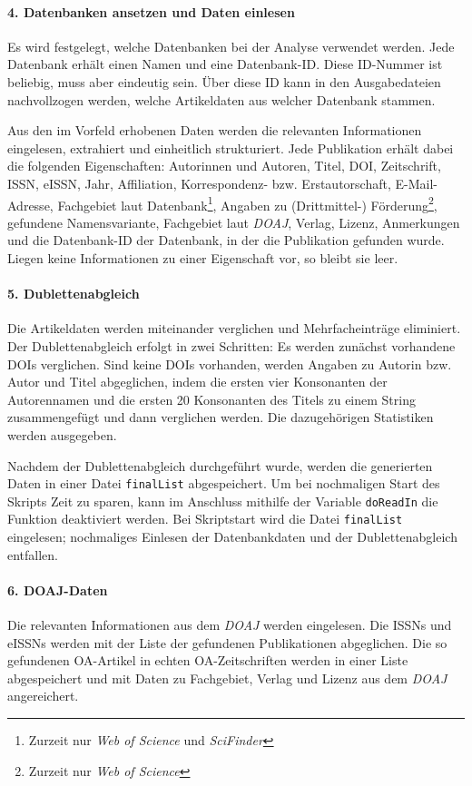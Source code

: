 \paragraph{4. Datenbanken ansetzen und Daten einlesen} \label{readinput}
Es wird festgelegt, welche Datenbanken bei der Analyse verwendet werden. Jede Datenbank erhält einen Namen und eine Datenbank-ID. Diese ID-Nummer ist beliebig, muss aber eindeutig sein. Über diese ID kann in den Ausgabedateien nachvollzogen werden, welche Artikeldaten aus welcher Datenbank stammen.

Aus den im Vorfeld erhobenen Daten werden die relevanten Informationen eingelesen, extrahiert und einheitlich strukturiert. Jede Publikation erhält dabei die folgenden Eigenschaften: Autorinnen und Autoren, Titel, DOI, Zeitschrift, ISSN, eISSN, Jahr, Affiliation, Korrespondenz- bzw. Erstautorschaft, E-Mail-Adresse, Fachgebiet laut Datenbank\footnote{Zurzeit nur \textit{Web of Science} und \textit{SciFinder}}, Angaben zu (Drittmittel-) Förderung\footnote{Zurzeit nur \textit{Web of Science}}, gefundene Namensvariante, Fachgebiet laut \textit{DOAJ}, Verlag, Lizenz, Anmerkungen und die Datenbank-ID der Datenbank, in der die Publikation gefunden wurde. Liegen keine Informationen zu einer Eigenschaft vor, so bleibt sie leer.

\paragraph{5. Dublettenabgleich} Die Artikeldaten werden miteinander verglichen und Mehrfacheinträge eliminiert. Der Dublettenabgleich erfolgt in zwei Schritten: Es werden  zunächst vorhandene DOIs verglichen. Sind keine DOIs vorhanden, werden Angaben zu Autorin bzw. Autor und Titel abgeglichen, indem die ersten vier Konsonanten der Autorennamen und die ersten 20 Konsonanten des Titels zu einem String zusammengefügt und dann verglichen werden. Die dazugehörigen Statistiken werden ausgegeben.

Nachdem der Dublettenabgleich durchgeführt wurde, werden die generierten Daten in einer Datei \texttt{finalList} abgespeichert. Um bei nochmaligen Start des Skripts Zeit zu sparen, kann im Anschluss mithilfe der Variable \texttt{doReadIn} die Funktion deaktiviert werden. Bei Skriptstart wird die Datei \texttt{finalList} eingelesen; nochmaliges Einlesen der Datenbankdaten und der Dublettenabgleich entfallen.

\paragraph{6. DOAJ-Daten}
Die relevanten Informationen aus dem \textit{DOAJ} werden eingelesen. Die ISSNs und eISSNs werden mit der Liste der gefundenen Publikationen abgeglichen. Die so gefundenen OA-Artikel in echten OA-Zeitschriften werden in einer Liste abgespeichert und mit Daten zu Fachgebiet, Verlag und Lizenz aus dem \textit{DOAJ} angereichert.

